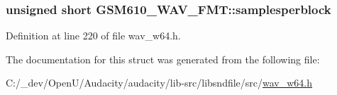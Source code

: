 \subsubsection[{\texorpdfstring{samplesperblock}{samplesperblock}}]{\setlength{\rightskip}{0pt plus 5cm}unsigned short G\+S\+M610\+\_\+\+W\+A\+V\+\_\+\+F\+M\+T\+::samplesperblock}\hypertarget{struct_g_s_m610___w_a_v___f_m_t_aaabdb5940b3caf845d724b86eca2dee9}{}\label{struct_g_s_m610___w_a_v___f_m_t_aaabdb5940b3caf845d724b86eca2dee9}


Definition at line 220 of file wav\+\_\+w64.\+h.



The documentation for this struct was generated from the following file\+:\begin{DoxyCompactItemize}
\item 
C\+:/\+\_\+dev/\+Open\+U/\+Audacity/audacity/lib-\/src/libsndfile/src/\hyperlink{wav__w64_8h}{wav\+\_\+w64.\+h}\end{DoxyCompactItemize}
